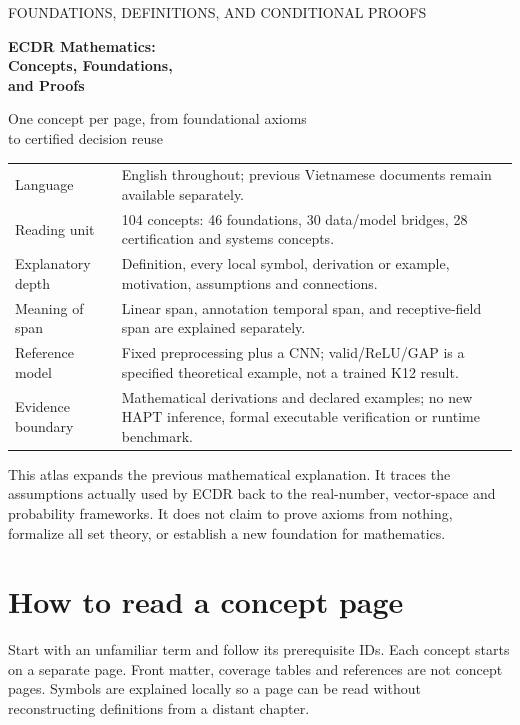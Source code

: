 \documentclass[11pt,a4paper]{article}
\begin{document}
\hypersetup{pageanchor=false}
\begin{titlepage}
\vspace*{1cm}
{\Large\color{teal} FOUNDATIONS, DEFINITIONS, AND CONDITIONAL PROOFS\par}
\vspace{0.7cm}
{\huge\bfseries\color{ink} ECDR Mathematics:\\Concepts, Foundations,\\and Proofs\par}
\vspace{0.8cm}
{\Large One concept per page, from foundational axioms\\to certified decision reuse\par}
\vspace{1cm}
\begin{tabularx}{\linewidth}{@{}P{3.2cm}Y@{}}\toprule
Language & English throughout; previous Vietnamese documents remain available separately.\\
Reading unit & 104 concepts: 46 foundations, 30 data/model bridges, 28 certification and systems concepts.\\
Explanatory depth & Definition, every local symbol, derivation or example, motivation, assumptions and connections.\\
Meaning of span & Linear span, annotation temporal span, and receptive-field span are explained separately.\\
Reference model & Fixed preprocessing plus a CNN; valid/ReLU/GAP is a specified theoretical example, not a trained K12 result.\\
Evidence boundary & Mathematical derivations and declared examples; no new HAPT inference, formal executable verification or runtime benchmark.\\\bottomrule
\end{tabularx}
\vfill
This atlas expands the previous mathematical explanation. It traces the
assumptions actually used by ECDR back to the real-number, vector-space and
probability frameworks. It does not claim to prove axioms from nothing,
formalize all set theory, or establish a new foundation for mathematics.
\end{titlepage}
\hypersetup{pageanchor=true}
\section*{How to read a concept page}
Start with an unfamiliar term and follow its prerequisite IDs. Each concept
starts on a separate page. Front matter, coverage tables and references are
not concept pages. Symbols are explained locally so a page can be read
without reconstructing definitions from a distant chapter.
\end{document}
